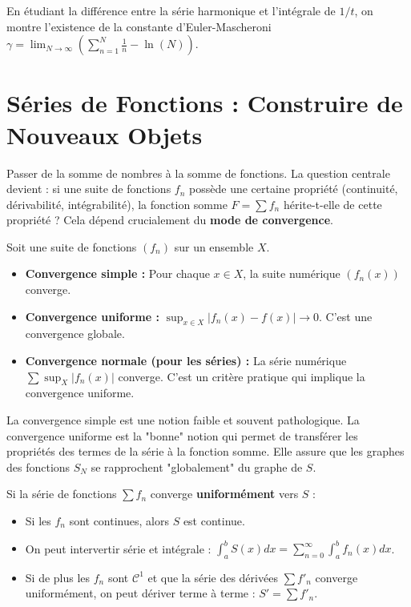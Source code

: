\begin{application}
    En étudiant la différence entre la série harmonique et l'intégrale de $1/t$, on montre l'existence de la constante d'Euler-Mascheroni $\gamma = \lim_{N \to \infty} \left( \sum_{n=1}^N \frac{1}{n} - \ln(N) \right)$.
\end{application}

\section{Séries de Fonctions : Construire de Nouveaux Objets}

\begin{objectif}
    Passer de la somme de nombres à la somme de fonctions. La question centrale devient : si une suite de fonctions $f_n$ possède une certaine propriété (continuité, dérivabilité, intégrabilité), la fonction somme $F = \sum f_n$ hérite-t-elle de cette propriété ? Cela dépend crucialement du \textbf{mode de convergence}.
\end{objectif}

\begin{definition}
    Soit une suite de fonctions $(f_n)$ sur un ensemble $X$.
    \begin{itemize}
        \item \textbf{Convergence simple :} Pour chaque $x \in X$, la suite numérique $(f_n(x))$ converge.
        \item \textbf{Convergence uniforme :} $\sup_{x \in X} |f_n(x) - f(x)| \to 0$. C'est une convergence globale.
        \item \textbf{Convergence normale (pour les séries) :} La série numérique $\sum \sup_X |f_n(x)|$ converge. C'est un critère pratique qui implique la convergence uniforme.
    \end{itemize}
\end{definition}

\begin{remark}
    La convergence simple est une notion faible et souvent pathologique. La convergence uniforme est la "bonne" notion qui permet de transférer les propriétés des termes de la série à la fonction somme. Elle assure que les graphes des fonctions $S_N$ se rapprochent "globalement" du graphe de $S$.
\end{remark}

\begin{theorem}
    Si la série de fonctions $\sum f_n$ converge \textbf{uniformément} vers $S$ :
    \begin{itemize}
        \item Si les $f_n$ sont continues, alors $S$ est continue.
        \item On peut intervertir série et intégrale : $\int_a^b S(x) dx = \sum_{n=0}^\infty \int_a^b f_n(x) dx$.
        \item Si de plus les $f_n$ sont $\mathcal{C}^1$ et que la série des dérivées $\sum f'_n$ converge uniformément, on peut dériver terme à terme : $S' = \sum f'_n$.
    \end{itemize}
\end{theorem}

